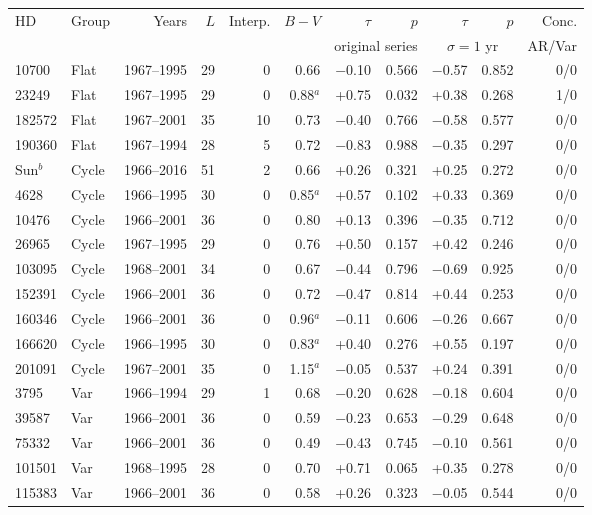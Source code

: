 \begin{tabular}{llrrrrrrrrr}
\hline
HD & Group & Years & $L$ & Interp. & $B\!-\!V$ & $\tau$ & $p$ & $\tau$ & $p$ & Conc. \\
 & & & & & & \multicolumn{2}{c}{original series} & \multicolumn{2}{c}{$\sigma = 1$ yr} & AR/Var \\
\hline
10700 & Flat & 1967--1995 & 29 & 0 & 0.66 & $-$0.10 & 0.566 & $-$0.57 & 0.852 & 0/0 \\
23249 & Flat & 1967--1995 & 29 & 0 & 0.88$^{a}$ & +0.75 & 0.032 & +0.38 & 0.268 & 1/0 \\
182572 & Flat & 1967--2001 & 35 & 10 & 0.73 & $-$0.40 & 0.766 & $-$0.58 & 0.577 & 0/0 \\
190360 & Flat & 1967--1994 & 28 & 5 & 0.72 & $-$0.83 & 0.988 & $-$0.35 & 0.297 & 0/0 \\
Sun$^{b}$ & Cycle & 1966--2016 & 51 & 2 & 0.66 & +0.26 & 0.321 & +0.25 & 0.272 & 0/0 \\
4628 & Cycle & 1966--1995 & 30 & 0 & 0.85$^{a}$ & +0.57 & 0.102 & +0.33 & 0.369 & 0/0 \\
10476 & Cycle & 1966--2001 & 36 & 0 & 0.80 & +0.13 & 0.396 & $-$0.35 & 0.712 & 0/0 \\
26965 & Cycle & 1967--1995 & 29 & 0 & 0.76 & +0.50 & 0.157 & +0.42 & 0.246 & 0/0 \\
103095 & Cycle & 1968--2001 & 34 & 0 & 0.67 & $-$0.44 & 0.796 & $-$0.69 & 0.925 & 0/0 \\
152391 & Cycle & 1966--2001 & 36 & 0 & 0.72 & $-$0.47 & 0.814 & +0.44 & 0.253 & 0/0 \\
160346 & Cycle & 1966--2001 & 36 & 0 & 0.96$^{a}$ & $-$0.11 & 0.606 & $-$0.26 & 0.667 & 0/0 \\
166620 & Cycle & 1966--1995 & 30 & 0 & 0.83$^{a}$ & +0.40 & 0.276 & +0.55 & 0.197 & 0/0 \\
201091 & Cycle & 1967--2001 & 35 & 0 & 1.15$^{a}$ & $-$0.05 & 0.537 & +0.24 & 0.391 & 0/0 \\
3795 & Var & 1966--1994 & 29 & 1 & 0.68 & $-$0.20 & 0.628 & $-$0.18 & 0.604 & 0/0 \\
39587 & Var & 1966--2001 & 36 & 0 & 0.59 & $-$0.23 & 0.653 & $-$0.29 & 0.648 & 0/0 \\
75332 & Var & 1966--2001 & 36 & 0 & 0.49 & $-$0.43 & 0.745 & $-$0.10 & 0.561 & 0/0 \\
101501 & Var & 1968--1995 & 28 & 0 & 0.70 & +0.71 & 0.065 & +0.35 & 0.278 & 0/0 \\
115383 & Var & 1966--2001 & 36 & 0 & 0.58 & +0.26 & 0.323 & $-$0.05 & 0.544 & 0/0 \\

\end{tabular}
